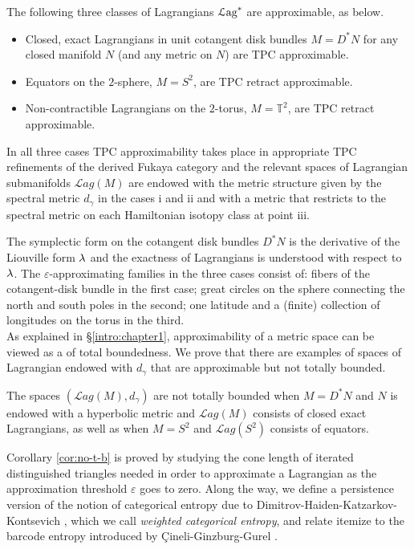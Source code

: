 \begin{thm}\label{intro:thmapprox}
    \label{thmmain1} The following three classes of Lagrangians ${\mathcal{L}\text{ag}}^*$ are approximable, as below.
\begin{itemize} 
\item[i.] Closed, exact Lagrangians in unit cotangent disk bundles $M=D^{\ast} N$ for any closed manifold $N$
(and any metric on $N$) are  TPC approximable.
\item[ii.] Equators on the $2$-sphere, $M=S^{2}$, are TPC retract approximable.
\item[iii.] Non-contractible Lagrangians on the $2$-torus, $M=\mathbb{T}^{2}$, are  TPC retract approximable.
\end{itemize} 
In all three cases  TPC approximability takes place in appropriate TPC refinements of the derived Fukaya category and the relevant spaces of Lagrangian submanifolds $\mathcal{L}ag(M)$ are endowed with the metric structure given by the spectral metric $d_{\gamma}$ in the cases i and ii and with a metric that restricts to the spectral metric on each Hamiltonian isotopy class at point iii. 
\end{thm}

The symplectic form on the cotangent disk bundles $D^{\ast}N$ is the derivative of the 
Liouville form $\lambda$ and the exactness of Lagrangians is understood with respect to $\lambda$. The $\varepsilon$-approximating families in the three cases consist of: fibers of the cotangent-disk bundle in the first case; great circles on the sphere connecting the north and south poles in the second; one latitude and a (finite) collection of longitudes on the torus in the third. \\

As explained in \S\ref{intro:chapter1}, approximability of a metric space can be viewed as a  of total boundedness. We prove that there are examples of spaces of Lagrangian endowed with $d_\gamma$ that are approximable but not totally bounded.

\begin{cor}\label{cor:no-t-b} The spaces $(\mathcal{L}ag(M),d_{\gamma})$ are not totally bounded when
$M=D^{\ast}N$ and $N$ is endowed with a hyperbolic metric and $\mathcal{L}ag(M)$ consists of closed exact Lagrangians, as well as when $M=S^{2}$ and $\mathcal{L}ag(S^{2})$ consists of equators.
\end{cor}

Corollary \ref{cor:no-t-b} is proved by studying the cone length of iterated distinguished triangles needed in order to approximate a Lagrangian as the approximation threshold $\varepsilon$ goes to zero. Along the way, we define a persistence version of the notion of categorical entropy due to Dimitrov-Haiden-Katzarkov-Kontsevich \cite{DHKK:dyn_cat}, which we call \textit{weighted categorical entropy}, and relate itemize to the barcode entropy introduced by \c{C}ineli-Ginzburg-Gurel \cite{CGG_bar_ent}.

